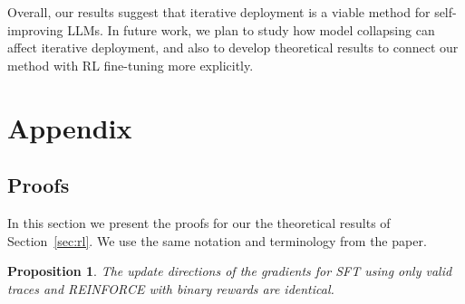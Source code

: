 \documentclass{article}
\newtheorem{proposition}{Proposition}
\begin{document}
Overall, our results suggest that iterative deployment is a viable method for
self-improving LLMs. In future work, we plan to study how model collapsing
\citep{shumailov-et-al-nature2024} can affect iterative deployment, and also to
develop theoretical results to connect our method with RL fine-tuning more
explicitly.






\newpage
\appendix

\section{Appendix}


\subsection{Proofs}
\label{appendix:proofs}

In this section we present the proofs for our the theoretical results of
Section~\ref{sec:rl}. We use the same notation and terminology from the paper.

\setcounter{proposition}{0}

\begin{proposition}
The update directions of the gradients for SFT using only
valid traces and REINFORCE with binary rewards are identical.
\end{proposition}
\end{document}

